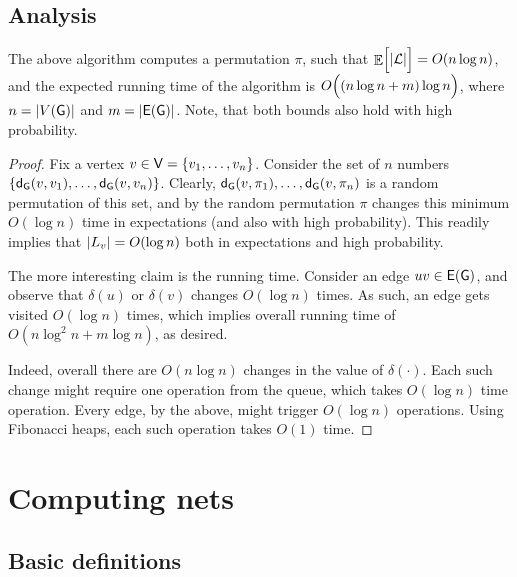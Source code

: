 \subsection{Analysis}

\begin{lemma}
    The above algorithm computes a permutation $\pi$, such that
    $\mathop{\mathbb{E}}\!\left[ {\Bigl.\left| {\mathcal{L}} \right|} \right] = O(n \log n)$, and the expected
    running time of the algorithm is
    $O\pth{\Bigl. (n\log n + m) \log n}$, where
    $n = \cardin{\VerticesX{\Graph}}$ and
    $m =\cardin{\EdgesX{\Graph}}$.  Note, that both bounds also hold
    with high probability.
\end{lemma}

\begin{proof}
    Fix a vertex $v \in \mathsf{V} = \left\{ {v_1,\ldots, v_n} \right\}$.  Consider
    the set of $n$ numbers $\brc{\distG{v}{v_1}, \ldots,
       \distG{v}{v_n}}$. Clearly, $\distG{v}{\pi_1}, \ldots,
    \distG{v}{\pi_n}$ is a random permutation of this set, and 
    by  the random permutation $\pi$ changes this
    minimum $O(\log n)$ time in expectations (and also with high
    probability). This readily implies that $\left| {L_v} \right| = O(\log n)$
    both in expectations and high probability.
    
    The more interesting claim is the running time. Consider an edge
    $uv \in \EdgesX{\Graph}$, and observe that $\delta(u)$ or
    $\delta(v)$ changes $O( \log n)$ times. As such, an edge gets
    visited $O( \log n)$ times, which implies overall running time of
    $O( n \log^2 n + m \log n)$, as desired. 

    Indeed, overall there are $O(n \log n)$ changes in the value of
    $\delta(\cdot)$. Each such change might require one
     operation from the queue, which takes
    $O(\log n)$ time operation. Every edge, by the above, might
    trigger $O( \log n)$  operations. Using
    Fibonacci heaps, each such operation takes $O(1)$ time.
\end{proof}


\section{Computing nets}

\subsection{Basic definitions}

